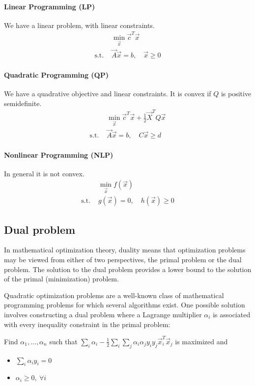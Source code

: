 \paragraph{Linear Programming (LP)}
We have a linear problem, with linear constraints.
\begin{align*}
    &\min_{\vec{x}} \vec{c}^T \vec{x}\\
    \text{s.t. } &\vec{A} \vec{x} = b, \quad \vec{x} \geq 0
\end{align*}

\paragraph{Quadratic Programming (QP)}
We have a quadrative objective and linear constraints. It is convex if \(Q\) is positive semidefinite.
\begin{align*}
    &\min_{\vec{x}} \vec{c}^T \vec{x} + \frac 1 2 \vec{X}^T Q \vec{x}\\
    \text{s.t. } &\vec{A}\vec{x} = b, \quad C\vec{x} \geq d
\end{align*}

\paragraph{Nonlinear Programming (NLP)}
In general it is not convex.
\begin{align*}
    &\min_{\vec{x}} f(\vec{x})\\
    \text{s.t. } &g(\vec{x}) = 0, \quad h(\vec{x}) \geq 0
\end{align*}

\subsection{Dual problem}
In mathematical optimization theory, duality means that optimization problems may be viewed from either of two perspectives, the primal problem or the dual problem. The solution to the dual problem provides a lower bound to the solution of the primal (minimization) problem.

Quadratic optimization problems are a well-known class of mathematical programming problems for which several algorithms exist. One possible solution involves constructing a dual problem where a Lagrange multiplier \(\alpha_i\) is associated with every inequality constraint in the primal problem:

Find \(\alpha_1, ..., \alpha_n\) such that \(\sum_i \alpha_i - \frac 1 2 \sum_i \sum_j \alpha_i \alpha_j y_i y_j \vec{x}_i^T \vec{x}_j\) is maximized and
\begin{itemize}
    \item
    \(\sum_i \alpha_i y_i = 0\)\\
    \item
    \(\alpha_i \geq 0,\ \forall i\)
\end{itemize}

